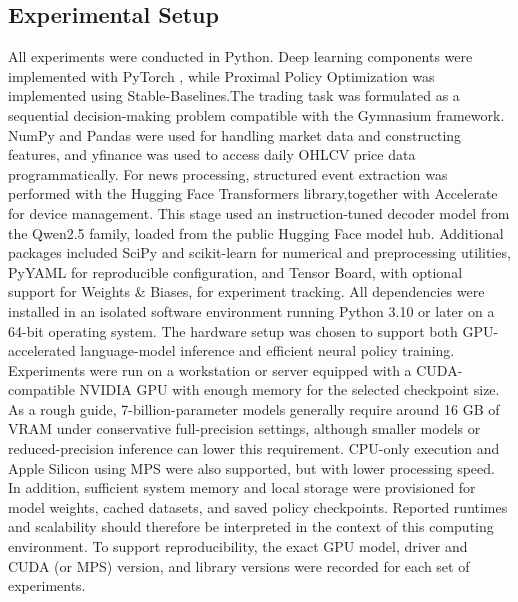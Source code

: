 \documentclass[a4paper,fleqn]{cas-sc}
\begin{document}
\subsection{Experimental Setup}\label{sec:Evaluation}
All experiments were conducted in Python. Deep learning components were implemented with PyTorch \cite{paszke2019pytorch}, while Proximal Policy Optimization was implemented using Stable-Baselines\cite{schulman2017ppo}.The trading task was formulated as a sequential decision-making problem compatible with the Gymnasium framework. NumPy and Pandas were used for handling market data and constructing features, and yfinance was used to access daily OHLCV price data programmatically. For news processing, structured event extraction was performed with the Hugging Face Transformers library\cite{kwiatkowski2024gymnasium},together with Accelerate for device management. This stage used an instruction-tuned decoder model from the Qwen2.5 family, loaded from the public Hugging Face model hub\cite{qwen2_5_2024}. Additional packages included SciPy and scikit-learn for numerical and preprocessing utilities, PyYAML for reproducible configuration, and Tensor Board, with optional support for Weights & Biases, for experiment tracking. All dependencies were installed in an isolated software environment running Python 3.10 or later on a 64-bit operating system.
The hardware setup was chosen to support both GPU-accelerated language-model inference and efficient neural policy training. Experiments were run on a workstation or server equipped with a CUDA-compatible NVIDIA GPU with enough memory for the selected checkpoint size. As a rough guide, 7-billion-parameter models generally require around 16 GB of VRAM under conservative full-precision settings, although smaller models or reduced-precision inference can lower this requirement. CPU-only execution and Apple Silicon using MPS were also supported, but with lower processing speed. In addition, sufficient system memory and local storage were provisioned for model weights, cached datasets, and saved policy checkpoints. Reported runtimes and scalability should therefore be interpreted in the context of this computing environment. To support reproducibility, the exact GPU model, driver and CUDA (or MPS) version, and library versions were recorded for each set of experiments.
\end{document}
